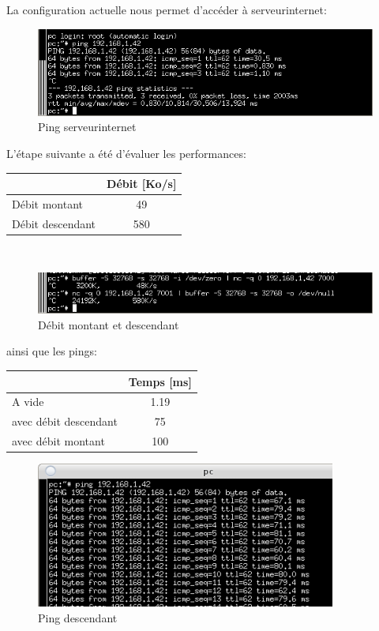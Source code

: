 \documentclass{article}
\begin{document}
La configuration actuelle nous permet d'accéder à serveurinternet:
\begin{figure}[h]
  \centering
  \includegraphics[width=\linewidth]{./captures/4-ping.png}
  \caption{Ping serveurinternet}
  \label{fig:token-bucket}
\end{figure}
\newpage

L'étape suivante a été d'évaluer les performances:

\begin{tabular}{|l|c|}
  \hline
   & Débit [Ko/s]\\
  \hline
  Débit montant & 49 \\
  Débit descendant & 580 \\
  \hline
\end{tabular}
\\

\begin{figure}[h]
	\centering
	\includegraphics{./captures/debit-descendant.png}
	\caption{Débit montant et descendant}
	\label{fig:token-bucket}
\end{figure}

ainsi que les pings:

\begin{tabular}{|l|c|}
  \hline
   & Temps [ms]\\
  \hline
  A vide & 1.19 \\
  avec débit descendant & 75 \\
  avec débit montant & 100 \\
  \hline
\end{tabular}


\begin{figure}[h]
	\centering
	\includegraphics{./captures/pingdescendant.png}
	\caption{Ping descendant}
	\label{fig:token-bucket}
\end{figure}
\end{document}
